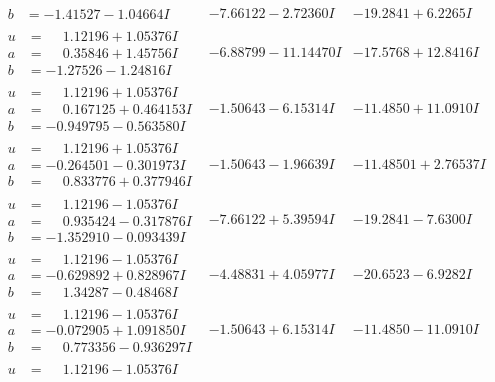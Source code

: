 \documentclass[1p]{elsarticle_modified}
\theoremstyle{definition}
\begin{document}
$$\begin{array}{c|c|c}
\begin{aligned}
b &= -1.41527 - 1.04664 I\end{aligned}
 & -7.66122 - 2.72360 I & -19.2841 + 6.2265 I \\ \hline\begin{aligned}
u &= \phantom{-}1.12196 + 1.05376 I \\
a &= \phantom{-}0.35846 + 1.45756 I \\
b &= -1.27526 - 1.24816 I\end{aligned}
 & -6.88799 - 11.14470 I & -17.5768 + 12.8416 I \\ \hline\begin{aligned}
u &= \phantom{-}1.12196 + 1.05376 I \\
a &= \phantom{-}0.167125 + 0.464153 I \\
b &= -0.949795 - 0.563580 I\end{aligned}
 & -1.50643 - 6.15314 I & -11.4850 + 11.0910 I \\ \hline\begin{aligned}
u &= \phantom{-}1.12196 + 1.05376 I \\
a &= -0.264501 - 0.301973 I \\
b &= \phantom{-}0.833776 + 0.377946 I\end{aligned}
 & -1.50643 - 1.96639 I & -11.48501 + 2.76537 I \\ \hline\begin{aligned}
u &= \phantom{-}1.12196 - 1.05376 I \\
a &= \phantom{-}0.935424 - 0.317876 I \\
b &= -1.352910 - 0.093439 I\end{aligned}
 & -7.66122 + 5.39594 I & -19.2841 - 7.6300 I \\ \hline\begin{aligned}
u &= \phantom{-}1.12196 - 1.05376 I \\
a &= -0.629892 + 0.828967 I \\
b &= \phantom{-}1.34287 - 0.48468 I\end{aligned}
 & -4.48831 + 4.05977 I & -20.6523 - 6.9282 I \\ \hline\begin{aligned}
u &= \phantom{-}1.12196 - 1.05376 I \\
a &= -0.072905 + 1.091850 I \\
b &= \phantom{-}0.773356 - 0.936297 I\end{aligned}
 & -1.50643 + 6.15314 I & -11.4850 - 11.0910 I \\ \hline\begin{aligned}
u &= \phantom{-}1.12196 - 1.05376 I \\

\end{aligned}
\end{array}$$
\end{document}
